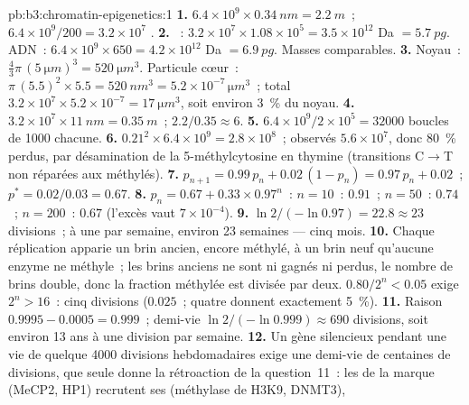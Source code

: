 \begin{solution}{pb:b3:chromatin-epigenetics:1}
\textbf{1.} $6.4\times 10^{9}\times \qty{0.34}{nm} = \qty{2.2}{m}$~;
$6.4\times 10^{9}/200 = 3.2\times 10^{7}$ .
\textbf{2.} ~: $3.2\times 10^{7}\times 1.08\times 10^{5} =
3.5\times 10^{12}$ Da $= \qty{5.7}{pg}$. ADN~: $6.4\times 10^{9}\times
650 = 4.2\times 10^{12}$ Da $= \qty{6.9}{pg}$. Masses comparables.
\textbf{3.} Noyau~: $\tfrac{4}{3}\pi\,(\qty{5}{\micro m})^{3} =
\qty{520}{\micro m^3}$. Particule cœur~: $\pi\,(5.5)^{2}\times 5.5 =
\qty{520}{nm^3} = 5.2\times 10^{-7}\,\unit{\micro m^3}$~; total
$3.2\times 10^{7}\times 5.2\times 10^{-7} = \qty{17}{\micro m^3}$, soit
environ \qty{3}{\%} du noyau.
\textbf{4.} $3.2\times 10^{7}\times \qty{11}{nm} = \qty{0.35}{m}$~;
 $2.2/0.35 \approx 6$.
\textbf{5.} $6.4\times 10^{9}/2\times 10^{5} = \num{32000}$ boucles de
\num{1000}  chacune.
\textbf{6.} $0.21^{2}\times 6.4\times 10^{9} = 2.8\times 10^{8}$~;
observés $5.6\times 10^{7}$, donc \qty{80}{\%} perdus, par désamination
de la 5-méthylcytosine en thymine (transitions C$\to$T non réparées aux
 méthylés).
\textbf{7.} $p_{n+1} = 0.99\,p_{n} + 0.02\,(1 - p_{n}) = 0.97\,p_{n} +
0.02$~; $p^{*} = 0.02/0.03 = 0.67$.
\textbf{8.} $p_{n} = 0.67 + 0.33\times 0.97^{n}$~: $n = 10$~: $0.91$~;
$n = 50$~: $0.74$~; $n = 200$~: $0.67$ (l'excès vaut $7\times 10^{-4}$).
\textbf{9.} $\ln 2/(-\ln 0.97) = 22.8 \approx 23$ divisions~; à une par
semaine, environ \num{23} semaines --- cinq mois.
\textbf{10.} Chaque réplication apparie un brin ancien, encore méthylé,
à un brin neuf qu'aucune enzyme ne méthyle~; les brins anciens ne sont
ni gagnés ni perdus, le nombre de brins double, donc la fraction
méthylée est divisée par deux. $0.80/2^{n} < 0.05$ exige $2^{n} > 16$~:
cinq divisions ($0.025$~; quatre donnent exactement \qty{5}{\%}).
\textbf{11.} Raison $0.9995 - 0.0005 = 0.999$~; demi-vie $\ln
2/(-\ln 0.999) \approx 690$ divisions, soit environ \num{13} ans à une
division par semaine.
\textbf{12.} Un gène silencieux pendant une vie de quelque \num{4000}
divisions hebdomadaires exige une demi-vie de centaines de divisions,
que seule donne la rétroaction de la question~11~: les  de la
marque (MeCP2, HP1) recrutent ses  (méthylase de H3K9, DNMT3),

\end{solution}
